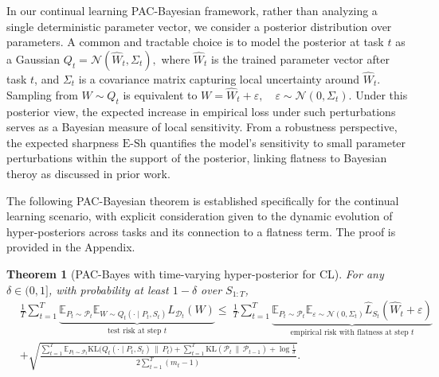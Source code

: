 \documentclass{article} %
\newtheorem{theorem}{Theorem}
\begin{document}
In our continual learning PAC-Bayesian framework, rather than analyzing a single deterministic parameter vector, we consider a posterior distribution over parameters.  A common and tractable choice is to model the posterior at task \(t\) as a Gaussian
 $ Q_t = \mathcal{N}(\hat{W}_t, \Sigma_t),$
 where \(\hat{W}_t\) is the trained parameter vector after task \(t\), and \(\Sigma_t\) is  a covariance matrix capturing local uncertainty around \(\hat{W}_t\). Sampling  from \(W \sim Q_t\) is equivalent to 
 $ W = \hat{W}_t + \varepsilon,
 \quad
 \varepsilon \sim \mathcal{N}(0, \Sigma_t).$
Under this posterior view, the expected increase in empirical loss under such perturbations serves as a Bayesian measure of local sensitivity.
From a robustness perspective, the expected sharpness $\mathrm{E\text{-}Sh}$ quantifies the model's sensitivity to small parameter perturbations within the support of the posterior, linking flatness to Bayesian theroy as discussed in prior work\cite{mllenhoff2023sam}.  


The following PAC-Bayesian theorem is established specifically for the continual learning scenario, with explicit consideration given to the dynamic evolution of hyper-posteriors across tasks and its connection to a flatness term. The proof is provided in the Appendix.
\begin{theorem}[PAC-Bayes with time-varying hyper-posterior for CL]\label{thm:pathwise-pacbayes}
For any $\delta\in(0,1]$, with probability at least $1-\delta$ over $S_{1:T}$,
\begin{equation}\label{eq:main-bound}
\begin{aligned} 
& \frac{1}{T} \sum_{t=1}^T \underbrace{\mathbb{E}_{P_t \sim \mathcal{P}_t} \mathbb{E}_{W \sim Q_t(\cdot \mid P_t, S_t)} L_{\mathcal{D}_t}(W)}_{\text{test risk at step } t} 
\le \ \frac{1}{T} \sum_{t=1}^T \underbrace{\mathbb{E}_{P_t \sim \mathcal{P}_t} \mathbb E_{\varepsilon\sim\mathcal N(0,\Sigma_t)}\hat L_{S_t}(\hat W_t+\varepsilon)}_{\text{empirical risk with flatness at step } t} \\ 
& + \sqrt{\frac{ \sum_{t=1}^T \mathbb{E}_{P_t \sim \mathcal{P}_t} \mathrm{KL}\big(Q_t(\cdot \mid P_t, S_t) \,\|\, P_t\big) + \sum_{t=1}^T \mathrm{KL}(\mathcal{P}_t \,\|\, \mathcal{P}_{t-1}) + \log\frac{1}{\delta} }{2 \sum_{t=1}^T (m_t - 1)}}. 
\end{aligned} 
\end{equation}
\end{theorem}
\end{document}
